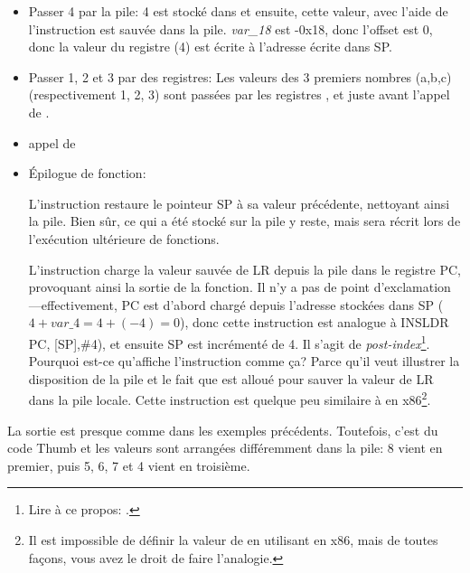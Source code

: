 \begin{itemize}
\item Passer 4 par la pile: 4 est stocké dans  et ensuite, cette valeur, avec l'aide de \\
l'instruction  est sauvée dans la pile.
\emph{var\_18} est -0x18, donc l'offset est 0, donc la valeur du registre 
(4) est écrite à l'adresse écrite dans \ac{SP}.

\item Passer 1, 2 et 3 par des registres:
Les valeurs des 3 premiers nombres (a,b,c) (respectivement 1, 2, 3) sont passées
par les registres ,  et  juste avant l'appel de \printf.

\item appel de \printf

\item Épilogue de fonction:

L'instruction  restaure le pointeur \ac{SP} à sa valeur
précédente, nettoyant ainsi la pile.
Bien sûr, ce qui a été stocké sur la pile y reste, mais sera récrit lors de
l'exécution ultérieure de fonctions.

L'instruction  charge la valeur sauvée de \ac{LR}
depuis la pile dans le registre \ac{PC}, provoquant ainsi la sortie de la fonction.
Il n'y a pas de point d'exclamation---effectivement, \ac{PC} est d'abord chargé
depuis l'adresse stockées dans \ac{SP} ($4+var\_4=4+(-4)=0$), donc cette instruction
est analogue à INS{LDR PC, [SP],\#4}), et ensuite \ac{SP} est incrémenté de 4.
Il s'agit de \emph{post-index}\footnote{Lire à ce propos: .}.
Pourquoi est-ce qu'\IDA affiche l'instruction comme ça?
Parce qu'il veut illustrer la disposition de la pile et le fait que 
est alloué pour sauver la valeur de \ac{LR} dans la pile locale.
Cette instruction est quelque peu similaire à  en x86\footnote{Il est
impossible de définir la valeur de  en utilisant \POP en x86, mais
de toutes façons, vous avez le droit de faire l'analogie.}.

\end{itemize}

\myparagraph{\OptimizingKeilVI: \ThumbMode}



La sortie est presque comme dans les exemples précédents. Toutefois, c'est du code
Thumb et les valeurs sont arrangées différemment dans la pile:
8 vient en premier, puis 5, 6, 7 et 4 vient en troisième.

